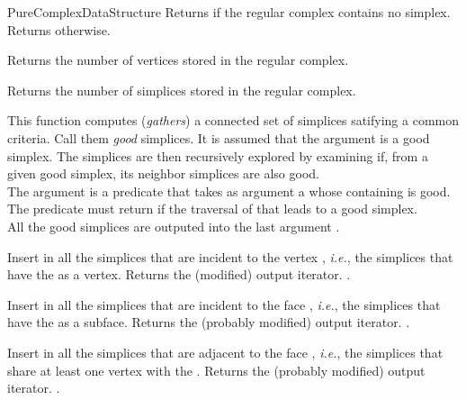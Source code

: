 \begin{ccRefConcept}{PureComplexDataStructure}
 { Returns  if the regular complex
contains no simplex. Returns  otherwise. }

{Returns the number of vertices stored in the regular complex.}

{Returns the number of simplices stored in the regular complex.}

{}

{}

{This function computes (\emph{gathers}) a connected set of simplices
satifying a common criteria. Call them \emph{good} simplices. It is assumed
that the argument  is a good simplex. The simplices are then
recursively explored by examining if, from a given good simplex, its neighbor
simplices are also good.\\
The argument  is a predicate that takes as argument a 
whose containing  is good. The predicate must return 
if the traversal of that  leads to a good simplex.\\
All the good simplices are outputed into the last argument .}

{Insert in  all the simplices that are incident to the vertex
, \emph{i.e.}, the simplices that have the  as a vertex.
Returns the (modified) output iterator.
\ccPrecond{}.}

{Insert in  all the simplices that are incident to the face ,
\emph{i.e.}, the simplices that have the  as a subface.
Returns the (probably modified) output iterator.
\ccPrecond{}.}

{Insert in  all the simplices that are adjacent to the face ,
\emph{i.e.}, the simplices that share at least one vertex with the . Returns the (probably modified) output iterator.
\ccPrecond{}.}


\end{ccRefConcept}
